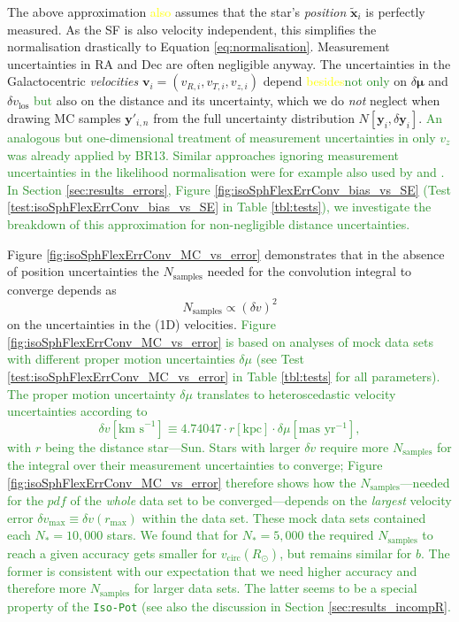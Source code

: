 \documentclass[iop,revtex4,numberedappendix,appendixfloats]{emulateapj}
\newcommand{\vect}[1]{\boldsymbol{#1}}
\newcommand{\pdf}{\ensuremath{pdf}}
\newcommand{\NEW}[1]{\textcolor{ForestGreen}{#1}}
\newcommand{\OLD}[1]{\textcolor{Yellow}{#1}}%
\begin{document}
The above approximation \OLD{also} assumes that the star's \emph{position} $\tilde{\vect{x}}_i$ is perfectly measured. As the SF is also velocity independent, this simplifies the normalisation drastically to Equation \eqref{eq:normalisation}. Measurement uncertainties in $\mathrm{RA}$ and $\mathrm{Dec}$ are often negligible anyway. The uncertainties in the Galactocentric \emph{velocities} $\vect{v}_i = (v_{R,i},v_{T,i},v_{z,i})$ depend \OLD{besides}\NEW{not only} on $\delta \vect{\mu}$ and $\delta v_\text{los}$ \NEW{but} also on the distance and its uncertainty, which we do \emph{not} neglect when drawing MC samples $\vect{y}'_{i,n}$ from the full uncertainty distribution $N[\vect{y}_i,\delta \vect{y}_i]$. \NEW{ An analogous but one-dimensional treatment of measurement uncertainties in only $v_z$ was already applied by BR13. Similar approaches ignoring measurement uncertainties in the likelihood normalisation were for example also used by \citet{2013MNRAS.433.1411M} and \citet{2016arXiv160309332D}. In Section \ref{sec:results_errors}, Figure \ref{fig:isoSphFlexErrConv_bias_vs_SE} (Test \ref{test:isoSphFlexErrConv_bias_vs_SE} in Table \ref{tbl:tests}), we investigate the breakdown of this approximation for non-negligible distance uncertainties.}

Figure \ref{fig:isoSphFlexErrConv_MC_vs_error} demonstrates that in the absence of position uncertainties the $N_\text{samples}$ needed for the convolution integral to converge depends as
\begin{equation*}
N_\text{samples} \propto \left( \delta v \right)^2
\end{equation*}
on the uncertainties in the (1D) velocities. 
\NEW{Figure \ref{fig:isoSphFlexErrConv_MC_vs_error} is based on analyses of mock data sets with different proper motion uncertainties $\delta \mu$ (see Test \ref{test:isoSphFlexErrConv_MC_vs_error} in Table \ref{tbl:tests} for all parameters). The proper motion uncertainty $\delta \mu$ translates to heteroscedastic velocity uncertainties according to 
\begin{equation*}
\delta v [\text{km s}^{-1}] \equiv 4.74047 \cdot r[\text{kpc}] \cdot \delta \mu [\text{mas yr}^{-1}],
\end{equation*}
with $r$ being the distance star---Sun. Stars with larger $\delta v$ require more $N_\text{samples}$ for the integral over their measurement uncertainties to converge; Figure  \ref{fig:isoSphFlexErrConv_MC_vs_error} therefore shows how the $N_\text{samples}$---needed for the \pdf{} of the \emph{whole} data set to be converged---depends on the \emph{largest} velocity error $\delta v_\text{max} \equiv \delta v(r_\text{max})$ within the data set.}
\NEW{These mock data sets contained each $N_{*}=10,000$ stars. We found that for $N_{*}=5,000$ the required $N_\text{samples}$ to reach a given accuracy gets smaller for $v_\text{circ}(R_\odot)$, but remains similar for $b$. The former is consistent with our expectation that  we need higher accuracy and therefore more $N_\text{samples}$ for larger data sets. The latter seems to be a special property of the \texttt{Iso-Pot} (see also the discussion in Section \ref{sec:results_incompR}.}
\end{document}
